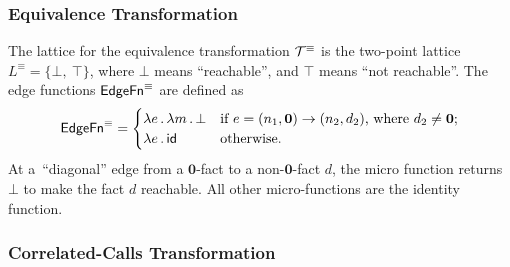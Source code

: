 

\subsubsection{Equivalence Transformation}\label{sec:equivtrans}

The lattice
for the equivalence transformation $\mathcal T^\equiv$ 
is the two-point lattice
    $L^\equiv=\{\bot,\ \top\}$,
where $\bot$ means ``reachable'', and $\top$ means ``not reachable''. 
The edge functions $\textsf{EdgeFn}^\equiv$ are defined as
\begin{equation}
    \textsf{EdgeFn}^\equiv=
    \begin{cases}
        \lambda e\,.\,\lambda m\,.\,\bot&\text{if $e=(n_1,\mathbf0)\to(n_2,d_2)$, where $d_2 \neq \mathbf0$;}\\
      \lambda e\,.\,\textsf{id}&\text{otherwise.}
    \end{cases}
\end{equation}
At a~``diagonal'' edge from a $\mathbf0$-fact to a non-$\mathbf0$-fact
$d$, the micro function returns $\bot$
to make
the fact $d$ reachable. All other micro-functions are the identity function.


\subsubsection{Correlated-Calls Transformation}\label{sec:cctrans}

